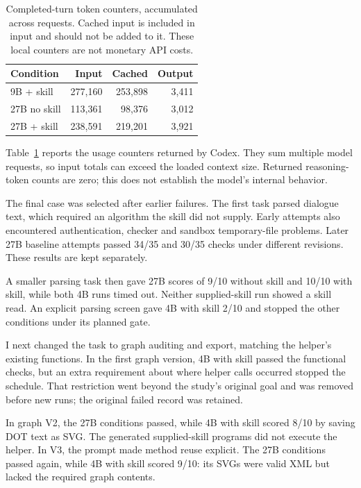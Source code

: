 \documentclass[11pt,a4paper,twocolumn]{article}
\makeatletter
\renewcommand\section{\@startsection{section}{1}{\z@}{-2.0ex plus -.5ex minus -.2ex}{.8ex plus .2ex}{\normalfont\fontsize{12}{14}\selectfont\bfseries}}
\makeatother
\begin{document}
\begin{table}[!htbp]
\centering
\fontsize{10}{12}\selectfont
\begin{tabular}{@{}lrrr@{}}
\toprule
Condition & Input & Cached & Output\\
\midrule
9B + skill & 277,160 & 253,898 & 3,411\\
27B no skill & 113,361 & 98,376 & 3,012\\
27B + skill & 238,591 & 219,201 & 3,921\\
\bottomrule
\end{tabular}
\caption{Completed-turn token counters, accumulated across requests. Cached input is included in input and should not be added to it. These local counters are not monetary API costs.}
\label{tab:tokens}
\end{table}

Table~\ref{tab:tokens} reports the usage counters returned by Codex. They sum multiple model requests, so input totals can exceed the loaded context size. Returned reasoning-token counts are zero; this does not establish the model's internal behavior.

\section{Earlier Attempts}
The final case was selected after earlier failures. The first task parsed dialogue text, which required an algorithm the skill did not supply. Early attempts also encountered authentication, checker and sandbox temporary-file problems. Later 27B baseline attempts passed 34/35 and 30/35 checks under different revisions. These results are kept separately.

A smaller parsing task then gave 27B scores of 9/10 without skill and 10/10 with skill, while both 4B runs timed out. Neither supplied-skill run showed a skill read. An explicit parsing screen gave 4B with skill 2/10 and stopped the other conditions under its planned gate.

I next changed the task to graph auditing and export, matching the helper's existing functions. In the first graph version, 4B with skill passed the functional checks, but an extra requirement about where helper calls occurred stopped the schedule. That restriction went beyond the study's original goal and was removed before new runs; the original failed record was retained.

In graph V2, the 27B conditions passed, while 4B with skill scored 8/10 by saving DOT text as SVG. The generated supplied-skill programs did not execute the helper. In V3, the prompt made method reuse explicit. The 27B conditions passed again, while 4B with skill scored 9/10: its SVGs were valid XML but lacked the required graph contents.
\end{document}
